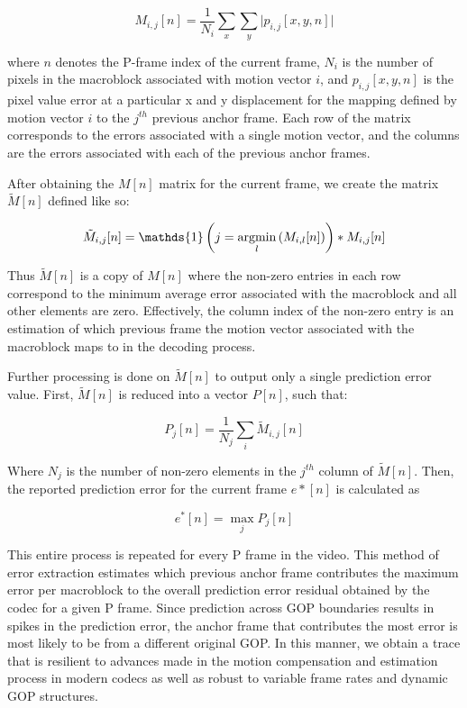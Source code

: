 \begin{equation}
M_{i,j}[n] = \frac{1}{N_{i}} \sum_{x} \sum_{y} \lvert p_{i,j}[x,y,n] \rvert
\end{equation}

where $n$ denotes the P-frame index of the current frame, $N_{i}$ is the number of pixels in the macroblock associated with motion vector $i$, and $p_{i,j}[x,y,n]$ is the pixel value error at a particular x and y displacement for the mapping defined by motion vector $i$ to the $j^{th}$ previous anchor frame. Each row of the matrix corresponds to the errors associated with a single motion vector, and the columns are the errors associated with each of the previous anchor frames.

After obtaining the $M[n]$ matrix for the current frame, we create the matrix $\tilde{M}[n]$ defined like so:

\begin{equation}
  \tilde{M}_{i, j}[n] = \mathds{1} \left(j = \argmin_{l} \left( M_{i, l}[n] \right) \right) * M_{i, j}[n]
\end{equation}

Thus $\tilde{M}[n]$ is a copy of $M[n]$ where the non-zero entries in each row correspond to the minimum average error associated with the macroblock and all other elements are zero. Effectively, the column index of the non-zero entry is an estimation of which previous frame the motion vector associated with the macroblock maps to in the decoding process.

Further processing is done on $\tilde{M}[n]$ to output only a single prediction error value. First, $\tilde{M}[n]$ is reduced into a vector $P[n]$, such that:

\begin{equation}
  P_{j}[n] = \frac{1}{N_{j}} \sum_{i}{\tilde{M}_{i,j}[n]}
\end{equation}

Where $N_{j}$ is the number of non-zero elements in the $j^{th}$ column of $\tilde{M}[n]$. Then, the reported prediction error for the current frame $e*[n]$ is calculated as

\begin{equation}
  e^{*}[n] = \max_{j} P_{j}[n]
\end{equation}

This entire process is repeated for every P frame in the video. This method of error extraction estimates which previous anchor frame contributes the maximum error per macroblock to the overall prediction error residual obtained by the codec for a given P frame. Since prediction across GOP boundaries results in spikes in the prediction error, the anchor frame that contributes the most error is most likely to be from a different original GOP. In this manner, we obtain a trace that is resilient to advances made in the motion compensation and estimation process in modern codecs as well as robust to variable frame rates and dynamic GOP structures.

